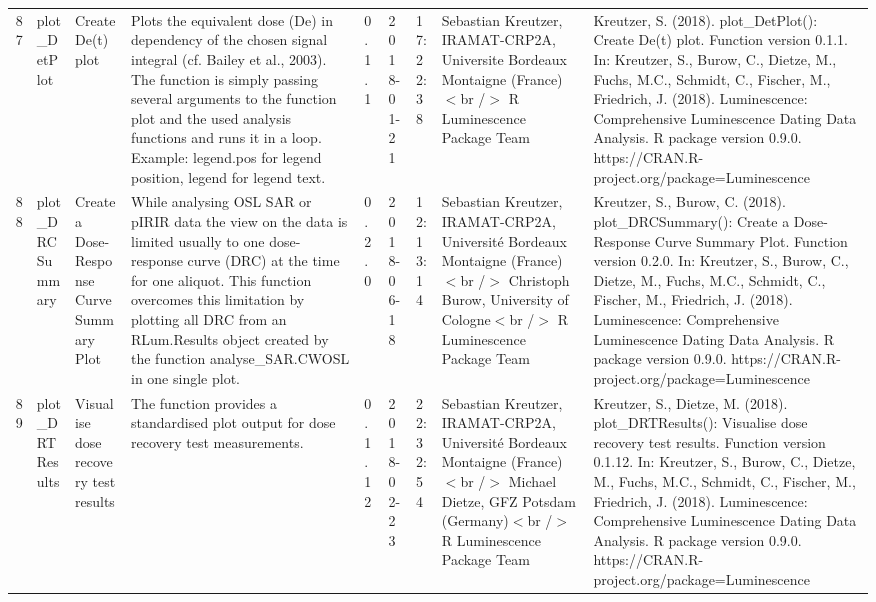 \begin{table}[ht]
\begin{tabular}{rllllllll}
 \\ 
  87 & plot\_DetPlot & Create De(t) plot & Plots the equivalent dose (De) in dependency of the chosen signal integral (cf. Bailey et al., 2003). The function is simply passing several arguments to the function  plot  and the used analysis functions and runs it in a loop. Example:  legend.pos  for legend position,  legend  for legend text. & 0.1.1 & 2018-01-21 & 17:22:38
 & Sebastian Kreutzer, IRAMAT-CRP2A, Universite Bordeaux Montaigne (France)$<$br /$>$  R Luminescence Package Team & Kreutzer, S. (2018). plot\_DetPlot(): Create De(t) plot. Function version 0.1.1. In: Kreutzer, S., Burow, C., Dietze, M., Fuchs, M.C., Schmidt, C., Fischer, M., Friedrich, J. (2018). Luminescence: Comprehensive Luminescence Dating Data Analysis. R package version 0.9.0. https://CRAN.R-project.org/package=Luminescence
 \\ 
  88 & plot\_DRCSummary & Create a Dose-Response Curve Summary Plot & While analysing OSL SAR or pIRIR data the view on the data is limited usually to one dose-response curve (DRC) at the time for one aliquot. This function overcomes this limitation by plotting all DRC from an  RLum.Results  object created by the function  analyse\_SAR.CWOSL  in one single plot. & 0.2.0 & 2018-06-18 & 12:13:14
 & Sebastian Kreutzer, IRAMAT-CRP2A, Université Bordeaux Montaigne (France)  $<$br /$>$ Christoph Burow, University of Cologne$<$br /$>$  R Luminescence Package Team & Kreutzer, S., Burow, C. (2018). plot\_DRCSummary(): Create a Dose-Response Curve Summary Plot. Function version 0.2.0. In: Kreutzer, S., Burow, C., Dietze, M., Fuchs, M.C., Schmidt, C., Fischer, M., Friedrich, J. (2018). Luminescence: Comprehensive Luminescence Dating Data Analysis. R package version 0.9.0. https://CRAN.R-project.org/package=Luminescence
 \\ 
  89 & plot\_DRTResults & Visualise dose recovery test results & The function provides a standardised plot output for dose recovery test measurements. & 0.1.12 & 2018-02-23 & 22:32:54
 & Sebastian Kreutzer, IRAMAT-CRP2A, Université Bordeaux Montaigne (France) $<$br /$>$ Michael Dietze, GFZ Potsdam (Germany)$<$br /$>$  R Luminescence Package Team & Kreutzer, S., Dietze, M. (2018). plot\_DRTResults(): Visualise dose recovery test results. Function version 0.1.12. In: Kreutzer, S., Burow, C., Dietze, M., Fuchs, M.C., Schmidt, C., Fischer, M., Friedrich, J. (2018). Luminescence: Comprehensive Luminescence Dating Data Analysis. R package version 0.9.0. https://CRAN.R-project.org/package=Luminescence
 \\ 

\end{tabular}
\end{table}
